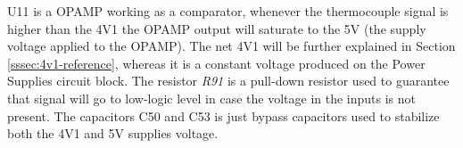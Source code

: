 	U11 is a OPAMP working as a comparator, whenever the thermocouple signal is higher than the 4V1 the OPAMP output will saturate to the 5V (the supply voltage applied to the OPAMP). The net 4V1 will be further explained in Section \ref{sssec:4v1-reference}, whereas it is a constant voltage produced on the Power Supplies circuit block. The resistor \textit{R91} is a pull-down resistor used to guarantee that signal will go to low-logic level in case the voltage in the inputs is not present. The capacitors C50 and C53 is just bypass capacitors used to stabilize both the 4V1 and 5V supplies voltage.